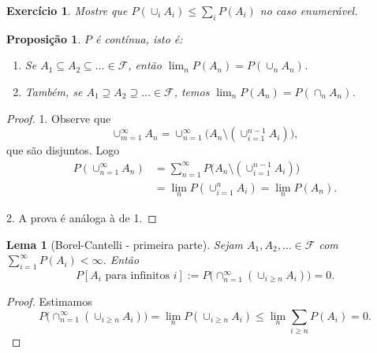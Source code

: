 \documentclass[reqno]{article}
\newcommand*\1{\mathds{1}}
\newtheorem{lemma}[theorem]{Lema}
\newtheorem{proposition}[theorem]{Proposição}
\newtheorem{exercise}[example]{Exercício}
\begin{document}
\begin{exercise}
  Mostre que $P(\cup_i A_i) \leq \sum_i P(A_i)$ no caso enumerável.
\end{exercise}

\begin{proposition}
  \label{p:prob_continua}
  $P$ é contínua, isto é:
  \begin{enumerate}
  \item Se $A_1 \subseteq A_2 \subseteq \dots \in \mathcal{F}$, então $\lim_n P(A_n) = P(\cup_n A_n)$.
  \item Também, se $A_1 \supseteq A_2 \supseteq \dots \in \mathcal{F}$, temos $\lim_n P(A_n) = P(\cap_n A_n)$.
  \end{enumerate}
\end{proposition}

\begin{proof}
  1.
  Observe que
  \begin{equation}
    \cup_{m = 1}^\infty A_n = \cup_{n = 1}^\infty \Big( A_n \setminus (\cup_{i=1}^{n-1} A_i) \Big),
  \end{equation}
  que são disjuntos.
  Logo
  \begin{equation}
    \begin{split}
      P(\cup_{n = 1}^\infty A_n) & = \sum_{n = 1}^\infty P\Big( A_n \setminus (\cup_{i=1}^{n-1} A_i) \Big)\\
      & = \lim_n P(\cup_{i = 1}^n A_i) = \lim_n P(A_n).
    \end{split}
  \end{equation}

  2.
  A prova é análoga à de 1.
\end{proof}

\begin{lemma}[Borel-Cantelli - primeira parte]
  Sejam $A_1, A_2, \dots \in \mathcal{F}$ com $\sum_{i = 1}^\infty P(A_i) < \infty$.
  Então
  \begin{equation}
    P[\text{$A_i$ para infinitos $i$}] := P\big(\cap_{n = 1}^\infty (\cup_{i \geq n} A_i)\big) = 0.
  \end{equation}
\end{lemma}

\begin{proof}
  Estimamos
  \begin{equation}
    P\big(\cap_{n = 1}^\infty (\cup_{i \geq n} A_i)\big) = \lim_n P(\cup_{i \geq n} A_i) \leq \lim_n \sum_{i \geq n} P(A_i) = 0.
  \end{equation}
\end{proof}
\end{document}
